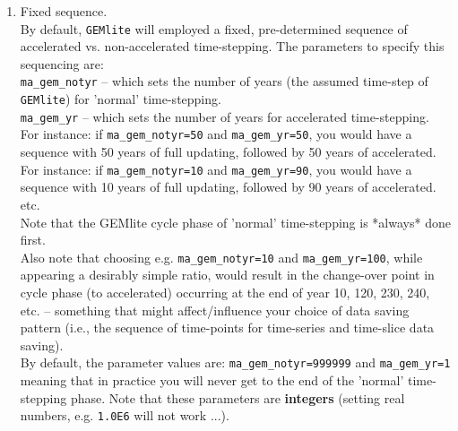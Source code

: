 \documentclass[11pt,fleqn]{book} %
\begin{document}
\begin{enumerate}
        
\vspace{1mm}
        \item Fixed sequence.
        \\By default, \texttt{GEMlite} will employed a fixed, pre-determined sequence of accelerated vs. non-accelerated time-stepping. The parameters to specify this sequencing are:
        \\\texttt{ma\_gem\_notyr} -- which sets the number of years (the assumed time-step of \texttt{GEMlite}) for 'normal' time-stepping.
        \\\texttt{ma\_gem\_yr} -- which sets the number of years for accelerated time-stepping.
\\For instance: if \texttt{ma\_gem\_notyr=50} and \texttt{ma\_gem\_yr=50}, you would have a sequence with 50 years of full updating, followed by 50 years of accelerated.
\\For instance: if \texttt{ma\_gem\_notyr=10} and \texttt{ma\_gem\_yr=90}, you would have a sequence with 10 years of full updating, followed by 90 years of accelerated.
\\etc.
\\Note that the GEMlite cycle phase of 'normal' time-stepping is *always* done first.
\\Also note that choosing e.g. \texttt{ma\_gem\_notyr=10} and \texttt{ma\_gem\_yr=100}, while appearing a desirably simple ratio, would result in the change-over point in cycle phase (to accelerated) occurring at the end of year 10, 120, 230, 240, etc. -- something that might affect/influence your choice of data saving pattern (i.e., the sequence of time-points for time-series and time-slice data saving).
\\By default, the parameter values are: \texttt{ma\_gem\_notyr=999999} and \texttt{ma\_gem\_yr=1} meaning that in practice you will never get to the end of the 'normal' time-stepping phase. Note that these parameters are \textbf{integers} (setting real numbers, e.g. \texttt{1.0E6} will not work ...).


\end{enumerate}
\end{document}
